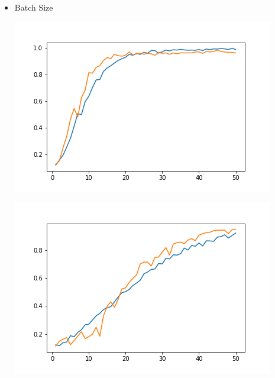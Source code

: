 \documentclass{article}
\begin{document}
\begin{sloppypar}
    \begin{itemize}
        \item Batch Size
            \begin{center}
                \begin{minipage}[b]{0.3\linewidth}
                    \includegraphics[width = \linewidth]{analysis/batch_size/b=1/b=1.png}
                \end{minipage}
                \hfill
                \begin{minipage}[b]{0.3\linewidth}
                    \includegraphics[width = \linewidth]{analysis/batch_size/b=5/b=5.png}
                \end{minipage}
                \hfill
                \begin{minipage}[b]{0.3\linewidth}

\end{minipage}
\end{center}
\end{itemize}
\end{sloppypar}
\end{document}
